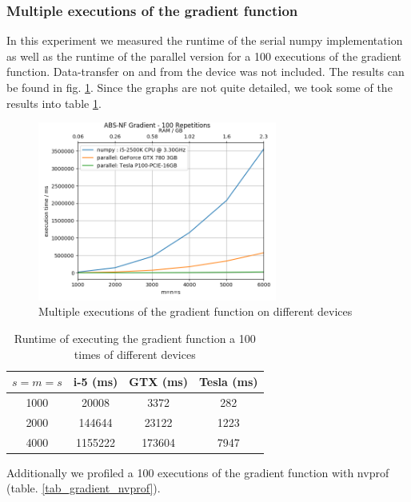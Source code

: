 \subsubsection{Multiple  executions of the gradient function}
In this experiment we measured the runtime of the serial numpy implementation as well as the runtime of the parallel version for a 100 executions of the gradient function. Data-transfer on and from the device was not included. The results can be found in fig. \ref{fig_grad_mult_executions}. Since the graphs are not quite detailed, we took some of the results into table \ref{tab_grad_mult_executions}.
\begin{figure}[ht]
	\centering
	\includegraphics[width=0.7\textwidth]{img/gradient_mult_repetition.png}
	\caption{Multiple executions of the gradient function on different devices}
	\label{fig_grad_mult_executions}
\end{figure}
\begin{table}
	\centering
\begin{tabular}{c|c|c|c}
	$s=m=s$ & i-5 (ms) & GTX (ms) & Tesla (ms) \\
	\hline
	1000 & 20008 & 3372 & 282 \\
	2000 & 144644 & 23122 & 1223 \\
	4000 & 1155222 & 173604 & 7947
	
\end{tabular}
\caption{Runtime of executing the gradient function a 100 times of different devices}
\label{tab_grad_mult_executions}
\end{table}

Additionally we profiled a 100 executions of the gradient function with nvprof (table. \ref{tab_gradient_nvprof}).


